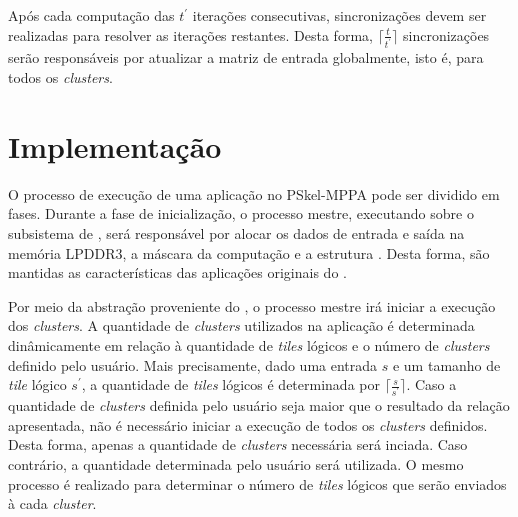 %

Após cada computação das $t^\prime$ iterações consecutivas,
sincronizações devem ser realizadas para resolver as iterações restantes. Desta
forma, $\lceil\frac{t}{t^\prime}\rceil$ sincronizações serão responsáveis por
atualizar a matriz de entrada globalmente, isto é, para todos os
\textit{clusters}.

\section{Implementação}

O processo de execução de uma aplicação no PSkel-MPPA pode ser dividido em
fases. Durante a fase de inicialização, o processo mestre, executando sobre o
subsistema de \es, será responsável por alocar os dados de entrada e saída na
memória LPDDR3, a máscara da computação e a estrutura \stencil. Desta forma, são
mantidas as características das aplicações originais do \pskel.

Por meio da abstração proveniente do \pskel, o processo mestre irá iniciar a
execução dos \textit{clusters}. A quantidade de \textit{clusters} utilizados na
aplicação é determinada dinâmicamente em relação à quantidade de \textit{tiles}
lógicos e o número de \textit{clusters} definido pelo usuário.  Mais
precisamente, dado uma entrada $s$ e um tamanho de \textit{tile} lógico
$s^\prime$, a quantidade de \textit{tiles} lógicos é determinada por
$\lceil\frac{s}{s^\prime}\rceil$. Caso a quantidade de \textit{clusters}
definida pelo usuário seja maior que o resultado da relação apresentada, não é
necessário iniciar a execução de todos os \textit{clusters} definidos. Desta
forma, apenas a quantidade de \textit{clusters} necessária será inciada. Caso
contrário, a quantidade determinada pelo usuário será utilizada. O mesmo
processo é realizado para determinar o número de \textit{tiles} lógicos que
serão enviados à cada \textit{cluster}.

